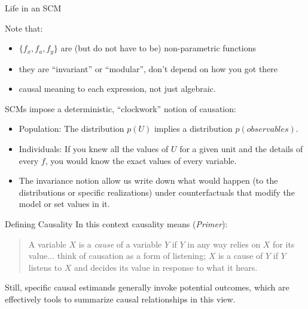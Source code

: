 \documentclass[xcolor=dvipsnames]{beamer}
\begin{document}
\begin{frame}{Life in an SCM}

 Note that:
\footnotesize
\begin{itemize}
\item $\{f_{x}, f_{a}, f_{y}\}$ are (but do not have to be) non-parametric functions
\item they are ``invariant'' or ``modular'', don't depend on how you got there
\item causal meaning to each expression, not just algebraic. 
\end{itemize}
\medskip
\normalsize
{} SCMs impose a deterministic, ``clockwork'' notion of causation:\\
\footnotesize
\begin{itemize}
\item<3-> Population: The distribution $p(U)$ implies a distribution $p(observables)$.
\item<4-> Individuals: If you knew all the values of $U$ for a given unit and the details of every $f$, you would know the exact values of every variable.
\item<5->  The invariance notion allow us write down what would happen (to the distributions or specific realizations) under counterfactuals that modify the model or set values in it.
\end{itemize}
\end{frame}

\begin{frame}{Defining Causality}
  In this context causality means (\textit{Primer}):\\
\small
\begin{quote}
A variable $X$ is a \textit{cause} of a variable $Y$ if $Y$ in any way relies on $X$ for its value... think of causation as a form of listening; $X$ is a cause of $Y$ if $Y$ listens to $X$ and decides its value in response to what it hears. 
\end{quote}

\normalsize
\bigskip

 Still, specific causal estimands generally invoke potential outcomes, which are effectively tools to summarize causal relationships in this view.
\end{frame}
\end{document}
